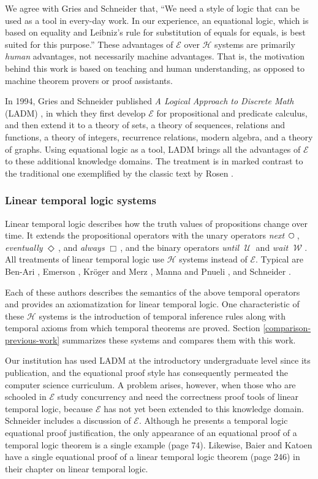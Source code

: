 \documentclass[12pt, fleqn, leqno]{article}
\newcommand{\Until}{\;\mathcal{U}\;}
\newcommand{\Wait}{\;\mathcal{W}\;}
\newcommand{\Next}{\;\,\text{\raisebox{3.5pt}{\circle{6}}}}
\newcommand{\Event}{\Diamond\,}
\newcommand{\Always}{\Box\,}
\begin{document}
We agree with Gries and Schneider \cite{LADM} that, ``We need a style of logic that can be used as a tool in every-day work.
In our experience, an equational logic, which is based on equality and Leibniz's rule for substitution of equals for equals, is best suited for this purpose.''
These advantages of $\mathcal{E}$ over $\mathcal{H}$ systems are primarily \textit{human} advantages, not necessarily machine advantages.
That is, the motivation behind this work is based on teaching and human understanding, as opposed to machine theorem provers or proof assistants.

In 1994, Gries and Schneider published \textit{A Logical Approach to Discrete Math} (LADM) \cite{LADM}, in which they first develop $\mathcal{E}$ for propositional and predicate calculus, and then extend it to a theory of sets, a theory of sequences, relations and functions, a theory of integers, recurrence relations, modern algebra, and a theory of graphs.
Using equational logic as a tool, LADM brings all the advantages of $\mathcal{E}$ to these additional knowledge domains.
The treatment is in marked contrast to the traditional one exemplified by the classic text by Rosen \cite{Rosen}.

\subsubsection*{Linear temporal logic systems}

Linear temporal logic describes how the truth values of propositions change over time.
It extends the propositional operators with the unary operators \textit{next} $\Next$, \textit{eventually} $\Event$, and \textit{always} $\Always$, and the binary operators \textit{until} $\Until$ and \textit{wait} $\Wait$.
All treatments of linear temporal logic use $\mathcal{H}$ systems instead of $\mathcal{E}$.
Typical are Ben-Ari \cite{Ben2}, Emerson \cite{Emer}, Kröger and Merz \cite{Kroger}, Manna and Pnueli \cite{Manna}, and Schneider \cite{Schn}.

Each of these authors describes the semantics of the above temporal operators and provides an axiomatization for linear temporal logic.
One characteristic of these $\mathcal{H}$ systems is the introduction of temporal inference rules along with temporal axioms from which temporal theorems are proved.
Section \ref{comparison-previous-work} summarizes these systems and compares them with this work.

Our institution has used LADM at the introductory undergraduate level since its publication, and the equational proof style has consequently permeated the computer science curriculum.
A problem arises, however, when those who are schooled in $\mathcal{E}$ study concurrency and need the correctness proof tools of linear temporal logic, because $\mathcal{E}$ has not yet been extended to this knowledge domain.
Schneider \cite{Schn} includes a discussion of $\mathcal{E}$.
Although he presents a temporal logic equational proof justification, the only appearance of an equational proof of a temporal logic theorem is a single example (page 74).
Likewise, Baier and Katoen \cite{Baier} have a single equational proof of a linear temporal logic theorem (page 246) in their chapter on linear temporal logic.
\end{document}
